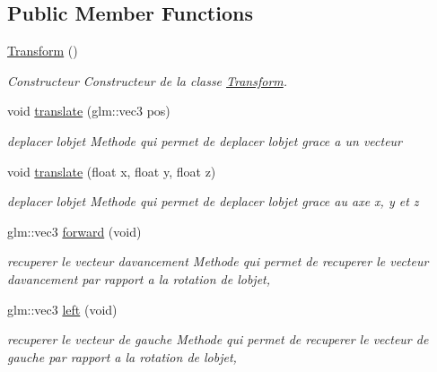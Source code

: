 \subsection*{Public Member Functions}
\begin{DoxyCompactItemize}
\item 
\mbox{\hyperlink{class_beer_engine_1_1_transform_aef3a2967a1503883c86bd74a3c6921fc}{Transform}} ()
\begin{DoxyCompactList}\small\item\em Constructeur Constructeur de la classe \mbox{\hyperlink{class_beer_engine_1_1_transform}{Transform}}. \end{DoxyCompactList}\item 
void \mbox{\hyperlink{class_beer_engine_1_1_transform_aaca147072f231beb5a0fe8b32f23b85d}{translate}} (glm\+::vec3 pos)
\begin{DoxyCompactList}\small\item\em deplacer l\textquotesingle{}objet Methode qui permet de deplacer l\textquotesingle{}objet grace a un vecteur \end{DoxyCompactList}\item 
void \mbox{\hyperlink{class_beer_engine_1_1_transform_a5f07e949bf65200de14b97f8c850bd43}{translate}} (float x, float y, float z)
\begin{DoxyCompactList}\small\item\em deplacer l\textquotesingle{}objet Methode qui permet de deplacer l\textquotesingle{}objet grace au axe x, y et z \end{DoxyCompactList}\item 
glm\+::vec3 \mbox{\hyperlink{class_beer_engine_1_1_transform_a82f0d0d75290c73e5ae8267e2d76f83b}{forward}} (void)
\begin{DoxyCompactList}\small\item\em recuperer le vecteur d\textquotesingle{}avancement Methode qui permet de recuperer le vecteur d\textquotesingle{}avancement par rapport a la rotation de l\textquotesingle{}objet, \end{DoxyCompactList}\item 
glm\+::vec3 \mbox{\hyperlink{class_beer_engine_1_1_transform_a5344e1be69d47951f434efdd7788ab4b}{left}} (void)
\begin{DoxyCompactList}\small\item\em recuperer le vecteur de gauche Methode qui permet de recuperer le vecteur de gauche par rapport a la rotation de l\textquotesingle{}objet, \end{DoxyCompactList}\item 

\end{DoxyCompactItemize}
